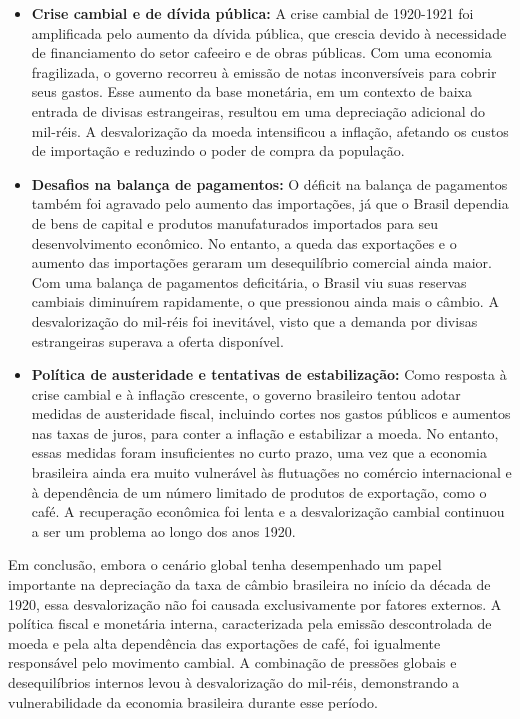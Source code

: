 \documentclass[a4paper,12pt]{article}[abntex2]
\begin{document}
\begin{itemize}
    \item \textbf{Crise cambial e de dívida pública:}
    A crise cambial de 1920-1921 foi amplificada pelo aumento da dívida pública, que crescia devido à necessidade de financiamento do setor cafeeiro e de obras públicas. Com uma economia fragilizada, o governo recorreu à emissão de notas inconversíveis para cobrir seus gastos. Esse aumento da base monetária, em um contexto de baixa entrada de divisas estrangeiras, resultou em uma depreciação adicional do mil-réis. A desvalorização da moeda intensificou a inflação, afetando os custos de importação e reduzindo o poder de compra da população.
    
    \item \textbf{Desafios na balança de pagamentos:}
    O déficit na balança de pagamentos também foi agravado pelo aumento das importações, já que o Brasil dependia de bens de capital e produtos manufaturados importados para seu desenvolvimento econômico. No entanto, a queda das exportações e o aumento das importações geraram um desequilíbrio comercial ainda maior. Com uma balança de pagamentos deficitária, o Brasil viu suas reservas cambiais diminuírem rapidamente, o que pressionou ainda mais o câmbio. A desvalorização do mil-réis foi inevitável, visto que a demanda por divisas estrangeiras superava a oferta disponível.
    
    \item \textbf{Política de austeridade e tentativas de estabilização:}
    Como resposta à crise cambial e à inflação crescente, o governo brasileiro tentou adotar medidas de austeridade fiscal, incluindo cortes nos gastos públicos e aumentos nas taxas de juros, para conter a inflação e estabilizar a moeda. No entanto, essas medidas foram insuficientes no curto prazo, uma vez que a economia brasileira ainda era muito vulnerável às flutuações no comércio internacional e à dependência de um número limitado de produtos de exportação, como o café. A recuperação econômica foi lenta e a desvalorização cambial continuou a ser um problema ao longo dos anos 1920.
\end{itemize}

Em conclusão, embora o cenário global tenha desempenhado um papel importante na depreciação da taxa de câmbio brasileira no início da década de 1920, essa desvalorização não foi causada exclusivamente por fatores externos. A política fiscal e monetária interna, caracterizada pela emissão descontrolada de moeda e pela alta dependência das exportações de café, foi igualmente responsável pelo movimento cambial. A combinação de pressões globais e desequilíbrios internos levou à desvalorização do mil-réis, demonstrando a vulnerabilidade da economia brasileira durante esse período.
\end{document}
